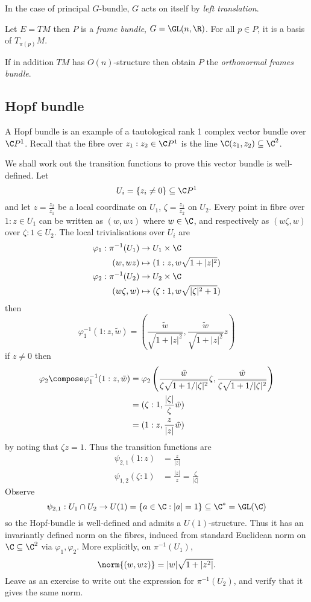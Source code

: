 \documentclass[a4paper]{article}
\begin{document}
In the case of principal \(G\)-bundle, \(G\) acts on itself by \emph{left translation}.

\begin{eg}
  Let \(E = TM\) then \(P\) is a \emph{frame bundle}, \(G = \GL(n, \R)\). For all \(p \in P\), it is a basis of \(T_{\pi(p)}M\).

  If in addition \(TM\) has \(O(n)\)-structure then obtain \(P\) the \emph{orthonormal frames bundle}.
\end{eg}

\subsection{Hopf bundle}

A Hopf bundle is an example of a tautological rank 1 complex vector bundle over \(\C P^1\). Recall that the fibre over \(z_1 : z_2 \in \C P^1\) is the line \(\C(z_1, z_2) \subseteq \C^2\).

We shall work out the transition functions to prove this vector bundle is well-defined. Let
\[
  U_i = \{z_i \neq 0\} \subseteq \C P^1
\]
and let \(z = \frac{z_2}{z_1}\) be a local coordinate on \(U_1\), \(\zeta = \frac{z_1}{z_2}\) on \(U_2\). Every point in fibre over \(1: z \in U_1\) can be written as \((w, wz)\) where \(w \in \C\), and respectively as \((w\zeta, w)\) over \(\zeta: 1 \in U_2\). The local trivialisations over \(U_i\) are
\begin{align*}
  \varphi_1: \pi^{-1}(U_1) &\to U_1 \times \C \\
  (w, wz) &\mapsto (1 : z, w \sqrt{1 + |z|^2}) \\
  \varphi_2: \pi^{-1}(U_2) &\to U_2 \times \C \\
  (w\zeta, w) &\mapsto (\zeta : 1, w \sqrt{|\zeta|^2 + 1})
\end{align*}
then
\[
  \varphi_1^{-1}(1: z, \tilde w) = \left( \frac{\tilde w}{\sqrt{1 + |z|^2}}, \frac{\tilde w}{\sqrt{1 + |z|^2}} z \right)
\]
if \(z \neq 0\) then
\begin{align*}
  \varphi_2 \compose \varphi_1^{-1}(1 : z, \tilde w)
  &= \varphi_2 \left( \frac{\tilde w}{\zeta \sqrt{1 + 1/|\zeta|^2}} \zeta, \frac{\tilde w}{\zeta{ }\sqrt{1 + 1/|\zeta|^2}} \right) \\
  &= (\zeta : 1, \frac{|\zeta|}{\zeta} \tilde w) \\
  &= (1 : z, \frac{z}{|z|} \tilde w)
\end{align*}
by noting that \(\zeta z = 1\). Thus the transition functions are
\begin{align*}
  \psi_{2, 1}(1 : z) & = \frac{z}{|z|} \\
  \psi_{1, 2}(\zeta: 1) &= \frac{|z|}{z} = \frac{\zeta}{|\zeta|}
\end{align*}
Observe
\[
  \psi_{2, 1}: U_1 \cap U_2 \to U(1) = \{a \in \C: |a| = 1\} \subseteq \C^* = \GL(\C)
\]
so the Hopf-bundle is well-defined and admits a \(U(1)\)-structure. Thus it has an invariantly defined norm on the fibres, induced from standard Euclidean norm on \(\C \subseteq \C^2\) via \(\varphi_1, \varphi_2\). More explicitly, on \(\pi^{-1}(U_1)\),
\[
  \norm{(w, wz)} = |w| \sqrt{1 + |z^2|}.
\]
Leave as an exercise to write out the expression for \(\pi^{-1}(U_2)\), and verify that it gives the same norm.
\end{document}
